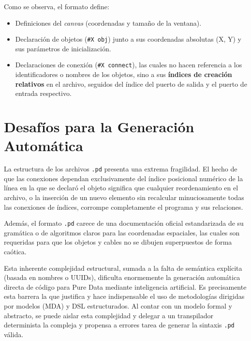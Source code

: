 Como se observa, el formato define:
\begin{itemize}
    \item Definiciones del \textit{canvas} (coordenadas y tamaño de la ventana).
    \item Declaración de objetos (\verb|#X obj|) junto a sus coordenadas absolutas (X, Y) y sus parámetros de inicialización.
    \item Declaraciones de conexión (\verb|#X connect|), las cuales no hacen referencia a los identificadores o nombres de los objetos, sino a sus \textbf{índices de creación relativos} en el archivo, seguidos del índice del puerto de salida y el puerto de entrada respectivo.
\end{itemize}

\section{Desafíos para la Generación Automática}

La estructura de los archivos \texttt{.pd} presenta una extrema fragilidad. El hecho de que las conexiones dependan exclusivamente del índice posicional numérico de la línea en la que se declaró el objeto significa que cualquier reordenamiento en el archivo, o la inserción de un nuevo elemento sin recalcular minuciosamente todas las conexiones de índices, corrompe completamente el programa y sus relaciones.

Además, el formato \texttt{.pd} carece de una documentación oficial estandarizada de su gramática o de algoritmos claros para las coordenadas espaciales, las cuales son requeridas para que los objetos y cables no se dibujen superpuestos de forma caótica.

Esta inherente complejidad estructural, sumada a la falta de semántica explícita (basada en nombres o UUIDs), dificulta enormemente la generación automática directa de código para Pure Data mediante inteligencia artificial. Es precisamente esta barrera la que justifica y hace indispensable el uso de metodologías dirigidas por modelos (MDA) y DSL estructurados. Al contar con un modelo formal y abstracto, se puede aislar esta complejidad y delegar a un transpilador determinista la compleja y propensa a errores tarea de generar la sintaxis \texttt{.pd} válida.
